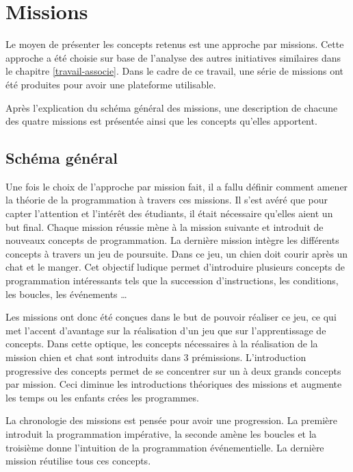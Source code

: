 ﻿\section{Missions}
\label{missions}
Le moyen de présenter les concepts retenus est une approche par \glspl{mission}. Cette approche a été choisie sur base de l'analyse des autres initiatives similaires dans le chapitre \ref{travail-associe}. Dans le cadre de ce travail, une série de \glspl{mission} ont été produites pour avoir une plateforme utilisable.

Après l'explication du schéma général des \glspl{mission}, une description de chacune des quatre \glspl{mission} est présentée ainsi que les concepts qu'elles apportent.

\subsection{Schéma général}
Une fois le choix de l'approche par mission fait, il a fallu définir comment amener la théorie de la programmation à travers ces \glspl{mission}. Il s'est avéré que pour capter l'attention et l'intérêt des étudiants, il était nécessaire qu'elles aient un but final. Chaque \gls{mission} réussie mène à la mission suivante et introduit de nouveaux concepts de programmation. La dernière mission intègre les différents concepts à travers un jeu de poursuite. Dans ce jeu, un chien doit courir après un chat et le manger. Cet objectif ludique permet d'introduire plusieurs concepts de programmation intéressants tels que la succession d'instructions, les conditions, les boucles, les événements \ldots

Les \glspl{mission} ont donc été conçues dans le but de pouvoir réaliser ce jeu, ce qui met l'accent d'avantage sur la réalisation d'un jeu que sur l'apprentissage de concepts. Dans cette optique, les concepts nécessaires à la réalisation de la \gls{mission} chien et chat sont introduits dans 3 prémissions. L'introduction progressive des concepts permet de se concentrer sur un à deux grands concepts par \gls{mission}. Ceci diminue les introductions théoriques des \glspl{mission} et augmente les temps ou les enfants crées les programmes.

La chronologie des \glspl{mission} est pensée pour avoir une progression. La première introduit la programmation impérative, la seconde amène les boucles et la troisième donne l'intuition de la programmation événementielle. La dernière \gls{mission} réutilise tous ces concepts.

